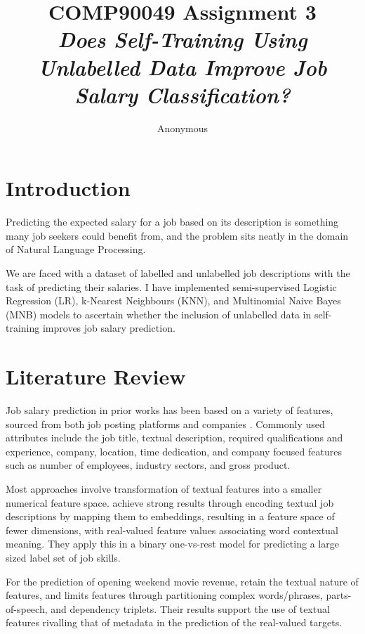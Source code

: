 \documentclass[11pt]{article}
\title{COMP90049 Assignment 3 \\ \textit{Does Self-Training Using Unlabelled Data Improve Job Salary Classification?}}
\author
{Anonymous}
\begin{document}
\maketitle

\section{Introduction}

Predicting the expected salary for a job based on its description 
is something many job seekers could benefit from, and the 
problem sits neatly in the domain of Natural Language Processing.

We are faced with a dataset of labelled and 
unlabelled job descriptions with the task of predicting their salaries.
I have implemented semi-supervised Logistic Regression (LR), 
k-Nearest Neighbours (KNN), and Multinomial Naive Bayes (MNB) models 
to ascertain whether the inclusion of unlabelled data in self-training improves job salary prediction.


\section{Literature Review}

Job salary prediction in prior works has been based on a variety of features, 
sourced from both job posting platforms and companies \citep{Samah2022}\citep{Martin2018}\citep{Bhola2020}\citep{Demir2022}.
Commonly used attributes include the job title, textual description, 
required qualifications and experience, company, location, time dedication, 
and company focused features such as number of employees, 
industry sectors, and gross product. 

Most approaches involve transformation of textual features into a smaller numerical feature space. \citet{Bhola2020} achieve strong results through encoding textual job descriptions 
by mapping them to embeddings, resulting in a feature space of fewer dimensions, 
with real-valued feature values associating word contextual meaning.
They apply this in a binary one-vs-rest model for predicting a large sized label set of job skills. 

For the prediction of opening weekend movie revenue,  \citet{Joshi2010} retain the textual nature of features, and 
limits features through partitioning complex words/phrases, 
parts-of-speech, and dependency triplets. Their results support 
the use of textual features rivalling that of metadata in the prediction of the real-valued targets.
\end{document}
